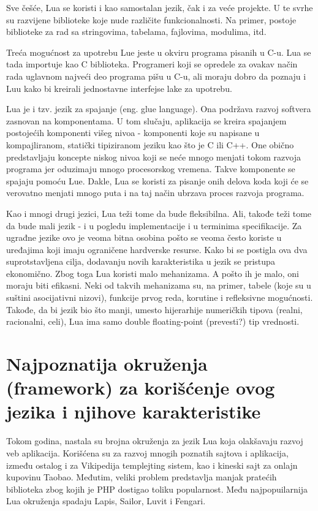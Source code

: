 \documentclass[a4paper]{article}
\begin{document}
Sve češće, Lua se koristi i kao samostalan jezik, čak i za veće projekte. U te svrhe su razvijene biblioteke koje nude različite funkcionalnosti. Na primer, postoje biblioteke za rad sa stringovima, tabelama, fajlovima, modulima, itd.

Treća mogućnost za upotrebu Lue jeste u okviru programa pisanih u C-u. Lua se tada importuje kao C biblioteka. Programeri koji se opredele za ovakav način rada uglavnom najveći deo programa pišu u C-u, ali moraju dobro da poznaju i Luu kako bi kreirali jednostavne interfejse lake za upotrebu.

Lua je i tzv. jezik za spajanje (eng. glue language). Ona podržava razvoj softvera zasnovan na komponentama. U tom slučaju, aplikacija se kreira spajanjem postojećih komponenti višeg nivoa - komponenti koje su napisane u kompajliranom, statički tipiziranom jeziku kao što je C ili C++. One obično predstavljaju koncepte niskog nivoa koji se neće mnogo menjati tokom razvoja programa jer oduzimaju mnogo procesorskog vremena. Takve komponente se spajaju pomoću Lue. Dakle, Lua se koristi za pisanje onih delova koda koji će se verovatno menjati mnogo puta i na taj način ubrzava proces razvoja programa.

Kao i mnogi drugi jezici, Lua teži tome da bude fleksibilna. Ali, takođe teži tome da bude mali jezik - i u pogledu implementacije i u terminima specifikacije. Za ugrađne jezike ovo je veoma bitna osobina pošto se veoma često koriste u uređajima koji imaju ograničene hardverske resurse. Kako bi se postigla ova dva suprotstavljena cilja, dodavanju novih karakteristika u jezik se pristupa ekonomično. Zbog toga Lua koristi malo mehanizama. A pošto ih je malo, oni moraju biti efikasni. Neki od takvih mehanizama su, na primer, tabele (koje su u suštini asocijativni nizovi), funkcije prvog reda, korutine i refleksivne mogućnosti. Takođe, da bi jezik bio što manji, umesto hijerarhije numeričkih tipova (realni, racionalni, celi), Lua ima samo double floating-point (prevesti?) tip vrednosti\cite{multiParadigms}.

\section{Najpoznatija okruženja (framework) za korišćenje ovog jezika i njihove karakteristike}
\label{sec:framework}

Tokom godina, nastala su brojna okruženja za jezik Lua koja olakšavaju razvoj veb aplikacija. Korišćena su za razvoj mnogih poznatih sajtova i aplikacija, između ostalog i za Vikipedija templejting sistem, kao i kineski sajt za onlajn kupovinu Taobao. Međutim, veliki problem predstavlja manjak pratećih biblioteka zbog kojih je PHP dostigao toliku popularnost. 
Među najpopuilarnija Lua okruženja spadaju Lapis, Sailor, Luvit i Fengari. 
\end{document}
